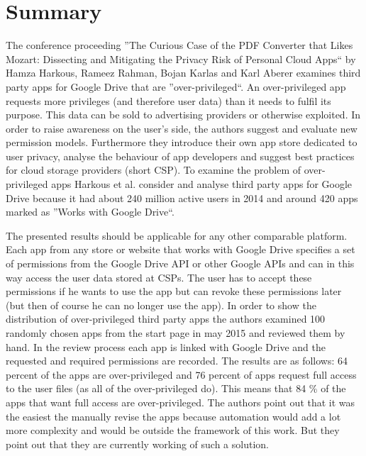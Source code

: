 \documentclass[11pt,twocolumn,a4paper,DIV=calc]{scrartcl}
\begin{document}
\section{Summary}
The conference proceeding ''The Curious Case of the PDF Converter that Likes Mozart: Dissecting and Mitigating the Privacy Risk of Personal Cloud Apps`` by Hamza Harkous, Rameez Rahman, Bojan Karlas and Karl Aberer \cite{Paper} examines third party apps for Google Drive that are ''over-privileged``. An over-privileged app requests more privileges (and therefore user data) than it needs to fulfil its purpose. This data can be sold to advertising providers or otherwise exploited. In order to raise awareness on the user's side, the authors suggest and evaluate new permission models. Furthermore they introduce their own app store dedicated to user privacy, analyse the behaviour of app developers and suggest best practices for cloud storage providers (short CSP). To examine the problem of over-privileged apps Harkous et al. consider and analyse third party apps for Google Drive because it had about 240 million active users in 2014 and around 420 apps marked as ''Works with Google Drive``. 

The presented results should be applicable for any other comparable platform. Each app from any store or website that works with Google Drive specifies a set of permissions from the Google Drive API or other Google APIs and can in this way access the user data stored at CSPs. The user has to accept these permissions if he wants to use the app but can revoke these permissions later (but then of course he can no longer use the app). In order to show the distribution of over-privileged third party apps the authors examined 100 randomly chosen apps from the start page in may 2015 and reviewed them by hand. 
In the review process each app is linked with Google Drive and the requested and required permissions are recorded. The results are as follows: 64 percent of the apps are over-privileged and 76 percent of apps request full access to the user files (as all of the over-privileged do). This means that 84 \% of the apps that want full access are over-privileged. The authors point out that it was the easiest the manually revise the apps because automation would add a lot more complexity and would be outside the framework of this work. But they point out that they are currently working of such a solution. 
\end{document}

